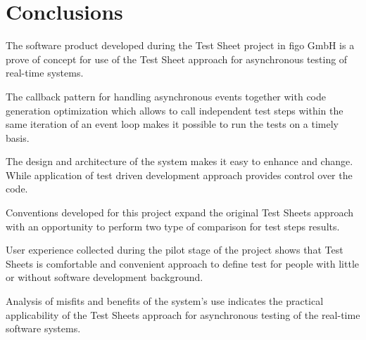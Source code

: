\chapter{Conclusions}
\label{chap:conclusion}
The software product developed during the Test Sheet project in figo GmbH is a prove of concept for use of the Test Sheet approach for asynchronous testing of real-time systems.


The callback pattern for handling asynchronous events together with code generation optimization which allows to call independent test steps within the same iteration of an event loop makes it possible to run the tests on a timely basis. 

The design and architecture of the system makes it easy to enhance and change. While application of test driven development approach provides control over the code.

Conventions developed for this project expand the original Test Sheets approach with an opportunity to perform two type of comparison for test steps results.

User experience collected during the pilot stage of the project shows that Test Sheets is comfortable and convenient approach to define test for people with little or without software development background.

Analysis of misfits and benefits of the system's use indicates the practical applicability of the Test Sheets approach for asynchronous testing of the real-time software systems.